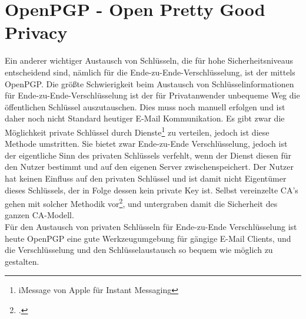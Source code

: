 \section{OpenPGP - Open Pretty Good Privacy}
Ein anderer wichtiger Austausch von Schlüsseln, die für hohe Sicherheitsniveaus entscheidend sind, nämlich für die Ende-zu-Ende-Verschlüsselung, ist der mittels OpenPGP.
Die größte Schwierigkeit beim Austausch von Schlüsselinformationen für Ende-zu-Ende-Verschlüsselung ist der für Privatanwender unbequeme Weg die öffentlichen Schlüssel auszutauschen. Dies muss noch manuell erfolgen und ist daher noch nicht Standard heutiger E-Mail Kommunikation. Es gibt zwar die Möglichkeit private Schlüssel durch Dienste\footnote{iMessage von Apple für Instant Messaging} zu verteilen, jedoch ist diese Methode umstritten. Sie bietet zwar Ende-zu-Ende Verschlüsselung, jedoch ist der eigentliche Sinn des privaten Schlüssels verfehlt, wenn der Dienst diesen für den Nutzer bestimmt und auf den eigenen Server zwischenspeichert. Der Nutzer hat keinen Einfluss auf den privaten Schlüssel und ist damit nicht Eigentümer dieses Schlüssels, der in Folge dessen kein private Key ist. 
Selbst vereinzelte \ac{CA}'s gehen mit solcher Methodik vor\footcite{c't}, und untergraben damit die Sicherheit des ganzen \ac{CA}-Modell. \medskip\\
Für den Austausch von privaten Schlüsseln für Ende-zu-Ende Verschlüsselung ist heute OpenPGP eine gute Werkzeugumgebung für gängige E-Mail Clients, und die Verschlüsselung und den Schlüsselaustausch so bequem wie möglich zu gestalten.